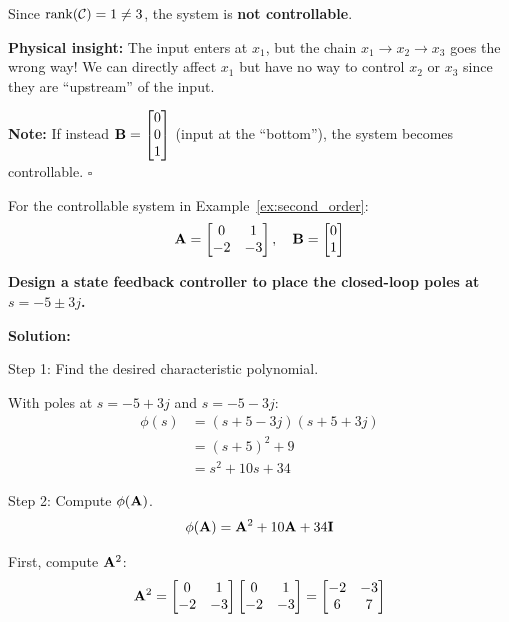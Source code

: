 \begin{example}
Since $\operatorname{rank}(\mathcal{C}) = 1 \neq 3$, the system is \textbf{not controllable}.

\textbf{Physical insight:} The input enters at $x_1$, but the chain $x_1 \to x_2 \to x_3$ goes the wrong way! We can directly affect $x_1$ but have no way to control $x_2$ or $x_3$ since they are ``upstream'' of the input.

\textbf{Note:} If instead $\mathbf{B} = \begin{bmatrix} 0 \\ 0 \\ 1 \end{bmatrix}$ (input at the ``bottom''), the system becomes controllable. \hfill $\square$
\end{example}

\begin{example}
\label{ex:ackermann}
For the controllable system in Example~\ref{ex:second_order}:
\begin{equation}
\mathbf{A} = \begin{bmatrix} 0 & 1 \\ -2 & -3 \end{bmatrix}, \quad
\mathbf{B} = \begin{bmatrix} 0 \\ 1 \end{bmatrix}
\end{equation}

\textbf{Design a state feedback controller to place the closed-loop poles at $s = -5 \pm 3j$.}

\textbf{Solution:}

Step 1: Find the desired characteristic polynomial.

With poles at $s = -5 + 3j$ and $s = -5 - 3j$:
\begin{align}
\phi(s) &= (s + 5 - 3j)(s + 5 + 3j) \\
&= (s + 5)^2 + 9 \\
&= s^2 + 10s + 34
\end{align}

Step 2: Compute $\phi(\mathbf{A})$.
\begin{equation}
\phi(\mathbf{A}) = \mathbf{A}^2 + 10\mathbf{A} + 34\mathbf{I}
\end{equation}

First, compute $\mathbf{A}^2$:
\begin{equation}
\mathbf{A}^2 = \begin{bmatrix} 0 & 1 \\ -2 & -3 \end{bmatrix} \begin{bmatrix} 0 & 1 \\ -2 & -3 \end{bmatrix} = \begin{bmatrix} -2 & -3 \\ 6 & 7 \end{bmatrix}
\end{equation}


\end{example}
